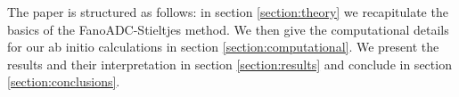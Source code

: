 The paper is structured as follows:
in section \ref{section:theory} we recapitulate the basics of the
FanoADC-Stieltjes method. We then give the computational details for our
ab initio calculations in section \ref{section:computational}. We present the
results and their interpretation in section \ref{section:results}
and conclude in section \ref{section:conclusions}.
